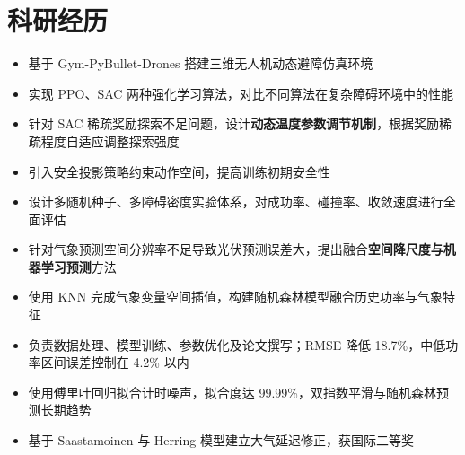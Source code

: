 \documentclass{resume}
\begin{document}
\section{科研经历}
\begin{itemize}
  \item 基于 Gym-PyBullet-Drones 搭建三维无人机动态避障仿真环境
  \item 实现 PPO、SAC 两种强化学习算法，对比不同算法在复杂障碍环境中的性能
  \item 针对 SAC 稀疏奖励探索不足问题，设计\textbf{动态温度参数调节机制}，根据奖励稀疏程度自适应调整探索强度
  \item 引入安全投影策略约束动作空间，提高训练初期安全性
  \item 设计多随机种子、多障碍密度实验体系，对成功率、碰撞率、收敛速度进行全面评估
\end{itemize}

\begin{itemize}
  \item 针对气象预测空间分辨率不足导致光伏预测误差大，提出融合\textbf{空间降尺度与机器学习预测}方法
  \item 使用 KNN 完成气象变量空间插值，构建随机森林模型融合历史功率与气象特征
  \item 负责数据处理、模型训练、参数优化及论文撰写；RMSE 降低 18.7\%，中低功率区间误差控制在 4.2\% 以内
\end{itemize}

\begin{itemize}
  \item 使用傅里叶回归拟合计时噪声，拟合度达 99.99\%，双指数平滑与随机森林预测长期趋势
  \item 基于 Saastamoinen 与 Herring 模型建立大气延迟修正，获国际二等奖
\end{itemize}
\end{document}
